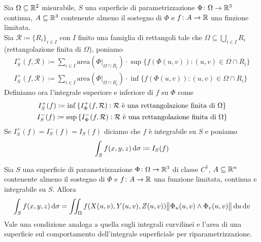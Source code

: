 \begin{definition}
	Sia $ \Omega \subseteq \mathbb{R}^2 $ misurabile, $ S $ una superficie di parametrizzazione $ \Phi \colon \Omega \to \mathbb{R}^3 $ continua, $ A \subseteq \mathbb{R}^3 $ contenente almeno il sostegno di $ \Phi $ e $ f \colon A \to \mathbb{R} $ una finzione limitata. \\
	Sia $ \mathcal{R} \coloneqq \{R_i\}_{i \in I} $ con $ I $ finito una famiglia di rettangoli tale che $ \Omega \subseteq \bigcup_{i \in I} R_i $ (rettangolazione finita di $ \Omega $), poniamo 
	\begin{gather*}
		I^+_{S}(f, \mathcal{R}) \coloneqq \sum_{i \in I} \mathrm{area}\left(\Phi \lvert_{\Omega \cap R_i}\right) \cdot \sup{\{f(\Phi(u, v)) : (u, v) \in \Omega \cap R_i\}} \\
		I^+_{S}(f, \mathcal{R}) \coloneqq \sum_{i \in I} \mathrm{area}\left(\Phi \lvert_{\Omega \cap R_i}\right) \cdot \inf{\{f(\Phi(u, v)) : (u, v) \in \Omega \cap R_i\}} 
	\end{gather*}
	Definiamo ora l'integrale superiore e inferiore di $ f $ su $ \Phi $ come
	\begin{gather*}
		I^+_{S}(f) \coloneqq \inf{\{I^+_{\Phi}(f, \mathcal{R}) : \text{$ \mathcal{R} $ è una rettangolazione finita di $ \Omega $}\}} \\
		I^-_{S}(f) \coloneqq \sup{\{I^-_{\Phi}(f, \mathcal{R}) : \text{$ \mathcal{R} $ è una rettangolazione finita di $ \Omega $}\}}
	\end{gather*}
	Se $ I^+_{S}(f) = I^-_{S}(f) = I_{S}(f) $ diciamo che $ f $ è integrabile su $ S $ e poniamo
	\begin{equation}
	\int_{S} f(x, y, z) \dif{\sigma} \coloneqq I_{S}(f)
	\end{equation}
\end{definition}

\begin{thm}
	Sia $ S $ una superficie di parametrizzazione $ \Phi \colon \Omega \to \mathbb{R}^3 $ di classe $ C^1 $, $ A \subseteq \mathbb{R}^n $ contenente almeno il sostegno di $ \Phi $ e $ f \colon A \to \mathbb{R} $ una funzione limitata, continua e integrabile su $ S $. Allora
	\begin{equation}
		\int_{S} f(x, y, z) \dif{\sigma} = \iint_{\Omega} f(X(u, v), Y(u, v), Z(u, v)) \norm{\Phi_u(u, v) \wedge \Phi_v(u, v)} \dif{u} \dif{v}
	\end{equation}
	Vale una condizione analoga a quella sugli integrali curvilinei e l'area di una superficie sul comportamento dell'integrale superficiale per riparametrizzazione.
\end{thm}

